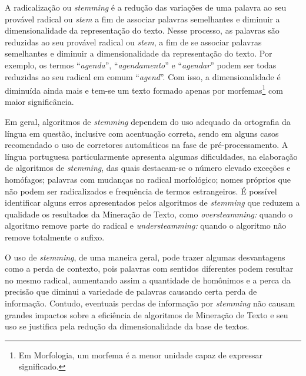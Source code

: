 A radicalização ou \textit{stemming} é a redução das variações de uma palavra ao seu provável radical ou \textit{stem} a fim de associar palavras semelhantes e diminuir a dimensionalidade da representação do texto.
Nesse processo, as palavras são reduzidas ao seu provável radical ou \textit{stem}, a fim de se associar palavras semelhantes e diminuir a dimensionalidade da representação do texto. Por exemplo, os termos ``\textit{agenda}'', ``\textit{agendamento}'' e ``\textit{agendar}'' podem ser todas reduzidas ao seu radical em comum ``\textit{agend}''. Com isso, a dimensionalidade é diminuída ainda mais e tem-se um texto formado apenas por morfemas\footnote{Em Morfologia, um morfema é a menor unidade capaz de expressar significado.} com maior significância.  
% 
%

Em geral, algoritmos de \textit{stemming} dependem do uso adequado da ortografia da língua em questão, inclusive com acentuação correta, sendo em alguns casos recomendado o uso de corretores automáticos na fase de pré-processamento. A língua portuguesa particularmente apresenta algumas dificuldades, na elaboração de algoritmos de \textit{stemming}, das quais destacam-se o número elevado exceções e homófagos; palavras com mudanças no radical morfológico; nomes próprios que não podem ser radicalizados e frequência de termos estrangeiros.  É possível identificar alguns erros apresentados pelos algoritmos de \textit{stemming} que reduzem a qualidade os resultados da Mineração de Texto, como \textit{oversteamming:} quando o algoritmo remove parte do radical e \textit{understeamming:} quando o algoritmo não remove totalmente o sufixo.

O uso de \textit{stemming}, de uma maneira geral, pode trazer algumas desvantagens como a perda de contexto, pois palavras com sentidos diferentes podem resultar no mesmo radical, aumentando assim a quantidade de homônimos e a perca da precisão que diminui a variedade de palavras causando certa perda de informação. Contudo, eventuais perdas de informação por \textit{stemming} não causam grandes impactos sobre a eficiência de algoritmos de Mineração de Texto e seu uso se justifica pela redução da dimensionalidade da base de textos.



